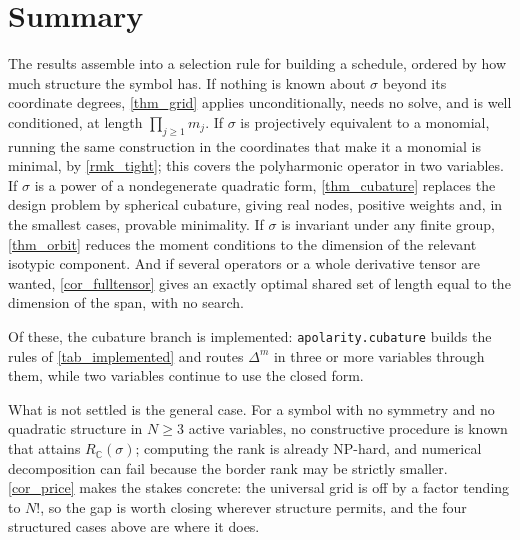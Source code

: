 \documentclass[final]{siamltex}
\newcommand{\C}{\mathbb{C}}
\begin{document}
\section{Summary}\label{sec_summary}

The results assemble into a selection rule for building a schedule, ordered by
how much structure the symbol has.  If nothing is known about $\sigma$ beyond
its coordinate degrees, \cref{thm_grid} applies unconditionally, needs no solve,
and is well conditioned, at length $\prod_{j\ge1}m_{j}$.  If $\sigma$ is
projectively equivalent to a monomial, running the same construction in the
coordinates that make it a monomial is minimal, by \cref{rmk_tight}; this covers
the polyharmonic operator in two variables.  If $\sigma$ is a power of a
nondegenerate quadratic form, \cref{thm_cubature} replaces the design problem by
spherical cubature, giving real nodes, positive weights and, in the smallest
cases, provable minimality.  If $\sigma$ is invariant under any finite group,
\cref{thm_orbit} reduces the moment conditions to the dimension of the relevant
isotypic component.  And if several operators or a whole derivative tensor are
wanted, \cref{cor_fulltensor} gives an exactly optimal shared set of length equal
to the dimension of the span, with no search.

Of these, the cubature branch is implemented: \texttt{apolarity.cubature} builds
the rules of \cref{tab_implemented} and routes $\Delta^{m}$ in three or more
variables through them, while two variables continue to use the closed form.

What is not settled is the general case.  For a symbol with no symmetry and no
quadratic structure in $N \ge 3$ active variables, no constructive procedure is
known that attains $R_{\C}(\sigma)$; computing the rank is already NP-hard, and
numerical decomposition can fail because the border rank may be strictly
smaller.  \cref{cor_price} makes the stakes concrete: the universal grid is off
by a factor tending to $N!$, so the gap is worth closing wherever structure
permits, and the four structured cases above are where it does.
\end{document}
